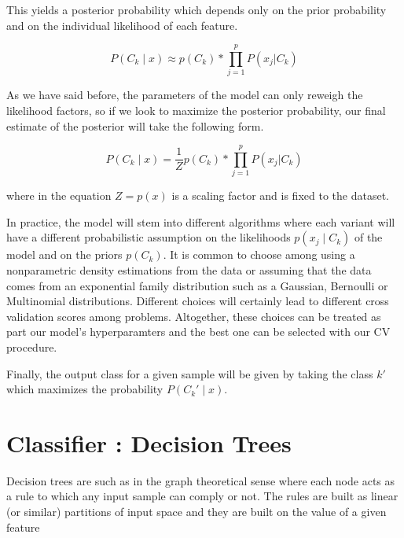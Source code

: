 This yields a posterior probability which depends only on the prior probability and on the individual likelihood of each feature.

\begin{equation}\label{equation-posteriorProbabilityDecomposition2}
P(C_k \mid x) \approx p(C_k) * \prod_{j=1}^{p}  P(x_j | C_k)
\end{equation}

As we have said before, the parameters of the model can only reweigh the likelihood factors, so if we look to maximize the posterior probability, our final estimate of the posterior will take the following form.

\begin{equation}
P(C_k \mid x) = \frac{1}{Z} p(C_k) * \prod_{j=1}^{p}  P(x_j | C_k)
\end{equation}\label{equation-posteriorProbabilityDecomposition3}

where in the equation $Z = p(x)$ is a scaling factor and is fixed to the dataset.

In practice, the model will stem into different algorithms where each variant will have a different probabilistic assumption on the likelihoods $p(x_j \mid C_k)$ of the model and on the priors $p(C_k)$. It is common to choose among using a nonparametric density estimations from the data or assuming that the data comes from an exponential family distribution such as a Gaussian, Bernoulli or Multinomial distributions. Different choices will certainly lead to different cross validation scores among problems. Altogether, these choices can be treated as part our model's hyperparamters and the best one can be selected with our CV procedure.


Finally, the output class for a given sample will be given by taking the class $k'$ which maximizes the probability $P(C_k' \mid x)$.

\section{Classifier : Decision Trees}


Decision trees are such as in the graph theoretical sense where each node acts as a rule to which any input sample can comply or not. The rules are built as linear (or similar) partitions of input space and they are built on the value of a given feature


